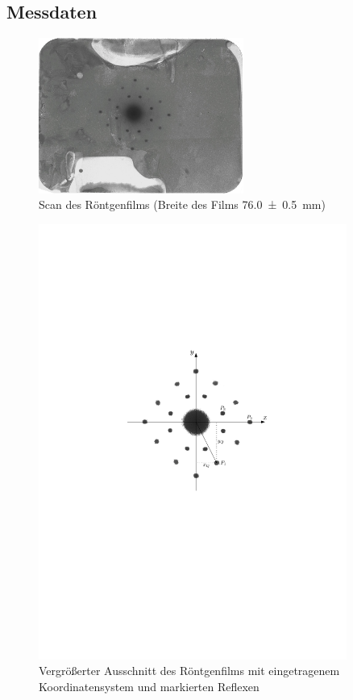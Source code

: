 \documentclass[11pt, a4paper]{article}
\begin{document}
\subsection{Messdaten}
\begin{figure}[h!]
\centering
\includegraphics[width=0.60\textwidth]{./grafiken/film.pdf}
\caption{Scan des Röntgenfilms (Breite des Films \SI{76,0 +- 0,5}{\milli\metre})}
\label{fig:film}
\end{figure}

\begin{figure}[h!]
\centering
\includegraphics[width=0.9\textwidth]{./grafiken/film_koord.pdf}
\caption{Vergrößerter Ausschnitt des Röntgenfilms mit eingetragenem Koordinatensystem und markierten Reflexen}
\label{fig:film_koord}
\end{figure}
\end{document}
